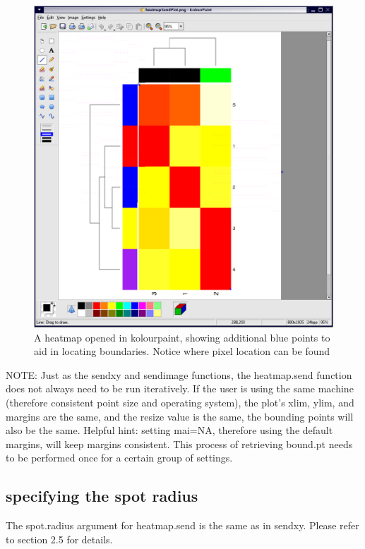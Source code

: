 \documentclass[]{article}
\begin{document}
\begin{center}
\begin{figure}
\includegraphics{heatmapPaint}
\caption{A heatmap opened in kolourpaint, showing additional blue points to aid in locating boundaries. Notice where pixel location can be found}
\end{figure}
\end{center}


NOTE: Just as the sendxy and sendimage functions, the heatmap.send function does not always need to be run iteratively. If the user is using the same machine (therefore consistent point size and operating system), the plot's xlim, ylim, and margins are the same, and the resize value is the same, the bounding points will also be the same. Helpful hint: setting mai=NA, therefore using the default margins, will keep margins consistent. This process of retrieving bound.pt needs to be performed once for a certain group of settings.\newline

\subsection{specifying the spot radius}

\indent The spot.radius argument for heatmap.send is the same as in sendxy. Please refer to section 2.5 for details. 
\end{document}
